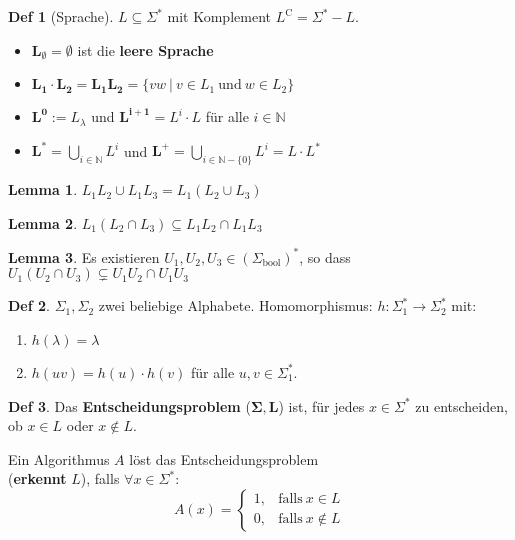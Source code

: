 \documentclass[a4paper, 10pt]{article}
\theoremstyle{definition}
\newtheorem{definition}{Def}[section]
\newtheorem{lemma}{Lemma}[section]
\newcommand{\N}{\mathbb{N}}
\newcommand{\words}{\Sigma^*}
\newcommand{\A}{\Sigma}
\begin{document}
\begin{definition}[Sprache]
    \(L \subseteq \words\) mit Komplement \(L^\text{C} = \words - L\).
    \begin{itemize}
        \item \(\bm{L_\emptyset} = \emptyset\) ist die \textbf{leere Sprache}
        \item \(\bm{L_1 \cdot L_2 = L_1 L_2} = \{vw \ | \ v \in L_1 \ \text{und} \ w \in L_2\}\)
        \item \(\bm{L^0} := L_\lambda\) und \(\bm{L^{i + 1}} = L^i \cdot L\) für alle \(i \in \N\)
        \item \(\bm{L^*} = \bigcup\limits_{i \in \N} L^i\) und \(\bm{L^+} = \bigcup\limits_{i \in \N - \{0\}} L^i = L \cdot L^*\)
    \end{itemize}
\end{definition}

\begin{lemma}
    \(L_1 L_2 \cup L_1 L_3 = L_1 (L_2 \cup L_3)\)
\end{lemma}

\begin{lemma}
    \(L_1 (L_2 \cap L_3) \subseteq L_1 L_2 \cap L_1 L_3\)
\end{lemma}

\begin{lemma}
    Es existieren \(U_1 , U_2, U_3 \in (\A_{\text{bool}})^*\), so dass \(U_1(U_2 \cap U_3) \subsetneq U_1 U_2 \cap U_1 U_3\)
\end{lemma}

\begin{definition}
    \(\A_1, \A_2\) zwei beliebige Alphabete. Homomorphismus: \(h : \A_1^* \to \A_2^*\) mit:
    \begin{enumerate}
        \item \(h(\lambda) = \lambda\)
        \item \(h(uv) = h(u) \cdot h(v)\) für alle \(u, v \in \words_1\).
    \end{enumerate} 
\end{definition}

\begin{definition}
    Das \textbf{Entscheidungsproblem} (\(\bm{\A, L}\)) ist, für jedes \(x \in \words\) zu entscheiden, ob \(x \in L\) oder \(x \not\in L\).

    Ein Algorithmus \(A\) löst das Entscheidungsproblem \\
    (\textbf{erkennt} \(L\)), falls \(\forall x \in \words\):
    \[A(x) = \begin{cases}
        1, & \text{falls} \ x \in L \\
        0, & \text{falls} \ x \not\in L
    \end{cases}\]
\end{definition}
\end{document}
